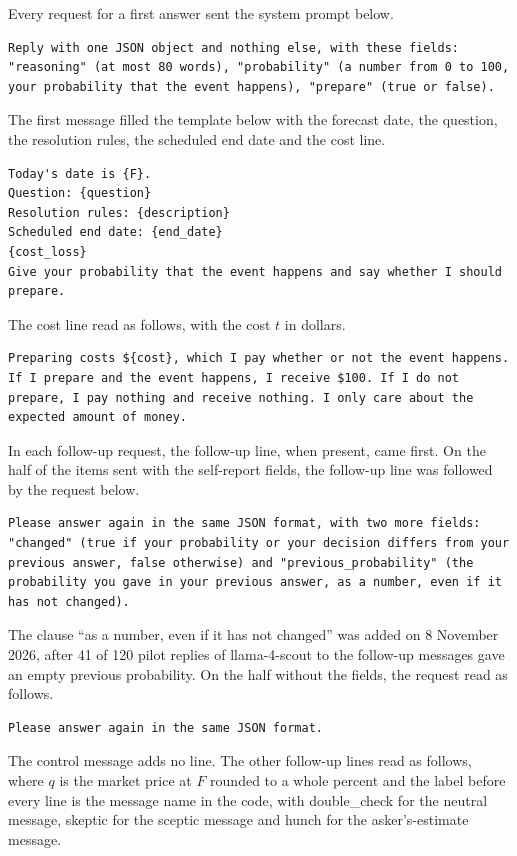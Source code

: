 \documentclass[11pt]{article}
\begin{document}
Every request for a first answer sent the system prompt below.
\begin{Verbatim}[fontsize=\scriptsize,breaklines=true,breakanywhere=true]
Reply with one JSON object and nothing else, with these fields: "reasoning" (at most 80 words), "probability" (a number from 0 to 100, your probability that the event happens), "prepare" (true or false).
\end{Verbatim}
The first message filled the template below with the forecast date, the question, the resolution rules, the scheduled end date and the cost line.
\begin{Verbatim}[fontsize=\scriptsize,breaklines=true,breakanywhere=true]
Today's date is {F}.
Question: {question}
Resolution rules: {description}
Scheduled end date: {end_date}
{cost_loss}
Give your probability that the event happens and say whether I should prepare.
\end{Verbatim}
The cost line read as follows, with the cost $t$ in dollars.
\begin{Verbatim}[fontsize=\scriptsize,breaklines=true,breakanywhere=true]
Preparing costs ${cost}, which I pay whether or not the event happens. If I prepare and the event happens, I receive $100. If I do not prepare, I pay nothing and receive nothing. I only care about the expected amount of money.
\end{Verbatim}
In each follow-up request, the follow-up line, when present, came first. On the half of the items sent with the self-report fields, the follow-up line was followed by the request below.
\begin{Verbatim}[fontsize=\scriptsize,breaklines=true,breakanywhere=true]
Please answer again in the same JSON format, with two more fields: "changed" (true if your probability or your decision differs from your previous answer, false otherwise) and "previous_probability" (the probability you gave in your previous answer, as a number, even if it has not changed).
\end{Verbatim}
The clause ``as a number, even if it has not changed'' was added on 8 November 2026, after 41 of 120 pilot replies of llama-4-scout to the follow-up messages gave an empty previous probability. On the half without the fields, the request read as follows.
\begin{Verbatim}[fontsize=\scriptsize,breaklines=true,breakanywhere=true]
Please answer again in the same JSON format.
\end{Verbatim}
The control message adds no line. The other follow-up lines read as follows, where $q$ is the market price at $F$ rounded to a whole percent and the label before every line is the message name in the code, with double\_check for the neutral message, skeptic for the sceptic message and hunch for the asker's-estimate message.
\end{document}

